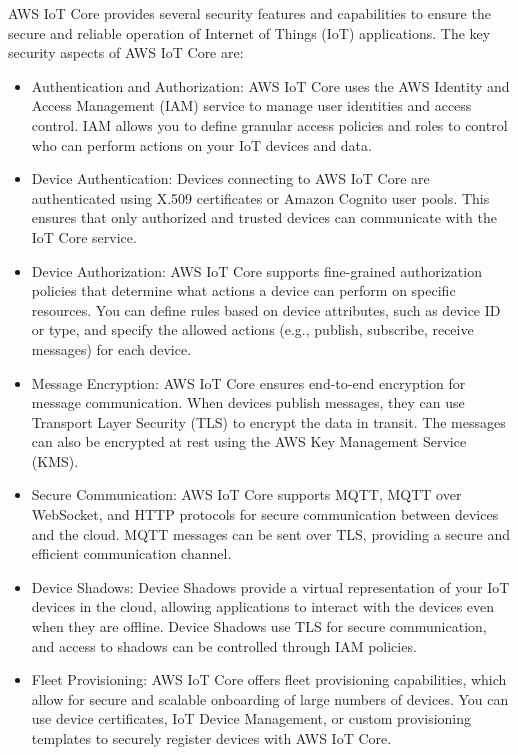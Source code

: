AWS IoT Core provides several security features and capabilities to ensure the secure and reliable operation of Internet of Things (IoT) applications. The key security aspects of AWS IoT Core are:

\begin{itemize}
	\item Authentication and Authorization: AWS IoT Core uses the AWS Identity and Access Management (IAM) service to manage user identities and access control. IAM allows you to define granular access policies and roles to control who can perform actions on your IoT devices and data.
	
	\item Device Authentication: Devices connecting to AWS IoT Core are authenticated using X.509 certificates or Amazon Cognito user pools. This ensures that only authorized and trusted devices can communicate with the IoT Core service.
	
	\item Device Authorization: AWS IoT Core supports fine-grained authorization policies that determine what actions a device can perform on specific resources. You can define rules based on device attributes, such as device ID or type, and specify the allowed actions (e.g., publish, subscribe, receive messages) for each device.
	
	\item Message Encryption: AWS IoT Core ensures end-to-end encryption for message communication. When devices publish messages, they can use Transport Layer Security (TLS) to encrypt the data in transit. The messages can also be encrypted at rest using the AWS Key Management Service (KMS).
	
	\item Secure Communication: AWS IoT Core supports MQTT, MQTT over WebSocket, and HTTP protocols for secure communication between devices and the cloud. MQTT messages can be sent over TLS, providing a secure and efficient communication channel.
	
	\item Device Shadows: Device Shadows provide a virtual representation of your IoT devices in the cloud, allowing applications to interact with the devices even when they are offline. Device Shadows use TLS for secure communication, and access to shadows can be controlled through IAM policies.
	
	\item Fleet Provisioning: AWS IoT Core offers fleet provisioning capabilities, which allow for secure and scalable onboarding of large numbers of devices. You can use device certificates, IoT Device Management, or custom provisioning templates to securely register devices with AWS IoT Core.
	

\end{itemize}
